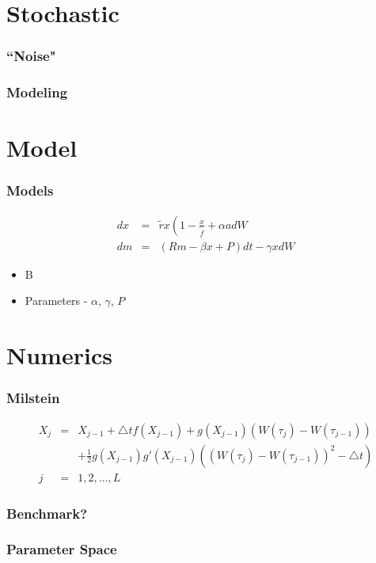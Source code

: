 



\section{Stochastic}

\begin{frame}
    \frametitle{``Noise"}
\end{frame}

\begin{frame}
    \frametitle{Modeling}
\end{frame}






\section{Model}

\begin{frame}
    \frametitle{Models}
	\begin{eqnarray}
		dx &=& \tilde{r} x \left( 1- \frac{x}{\tilde{f}} +\alpha a dW \\
		dm &=& (Rm - \beta x + P) dt - \gamma x dW
	\end{eqnarray}
	\begin{itemize}
		\item B
		\item Parameters - $\alpha$, $\gamma$, $P$
	\end{itemize}
\end{frame}





\section{Numerics}

\begin{frame}
    \frametitle{Milstein}
	\begin{eqnarray*}
		X_{j} &=& X_{j-1} + \triangle tf(X_{j-1}) + g(X_{j-1})(W(\tau_{j})-W(\tau_{j-1})) 			\nonumber\\ 
		&& + \frac{1}{2} g(X_{j-1})g'(X_{j-1})((W(\tau_{j})-W(\tau_{j-1}))^{2}-\triangle t)
		\\ j &=& 1,2,... ,L
	\end{eqnarray*}

\end{frame}

\begin{frame}
    \frametitle{Benchmark?}
\end{frame}

\begin{frame}
    \frametitle{Parameter Space}
\end{frame}



